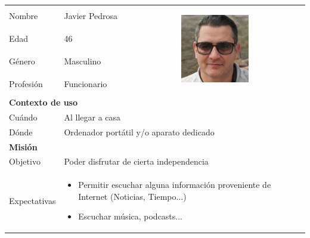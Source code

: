 \begin{table}[H]
	\centering
	\begin{tabular}{|l|l|l|} 
		\hline
		Nombre       & Javier Pedrosa & \multirow{4}{*}{
			\begin{minipage}[t]{0.4\textwidth}
				\begin{center}
					\includegraphics[height=3cm]{imagenes/Persona2.jpg}
				\end{center}
			\end{minipage}
		}                 \\ [2ex]
		\cline{1-2}
		Edad         & 46 &                                   \\ [2ex] 
		\cline{1-2}
		Género         & Masculino &                                   \\ [2ex]
		\cline{1-2}
		Profesión    & 
			\begin{minipage}[t]{0.3 \textwidth}
				Funcionario
			\end{minipage}
		 &                                   \\ [2ex] 
		\hline
		\multicolumn{3}{|l|}{\cellcolor{lightblue}\textbf{Contexto de uso}}               \\ 
		\hline
		Cuándo       & \multicolumn{2}{l|}{Al llegar a casa}                \\ 
		\hline
		Dónde        & \multicolumn{2}{l|}{Ordenador portátil y/o aparato dedicado}                \\ 
		\hline
		\multicolumn{3}{|l|}{\cellcolor{lightblue}\textbf{Misión}}                        \\ 
		\hline
		Objetivo     & \multicolumn{2}{l|}{Poder disfrutar de cierta independencia}                \\ 
		\hline
		Expectativas & \multicolumn{2}{l|}{
			\begin{minipage} [t] {0.7\textwidth}
				\begin{itemize}
					\item Permitir escuchar alguna información proveniente de Internet (Noticias, Tiempo...)
					\item Escuchar música, podcasts...
				\end{itemize}
			\end{minipage}
}
\end{tabular}
\end{table}
